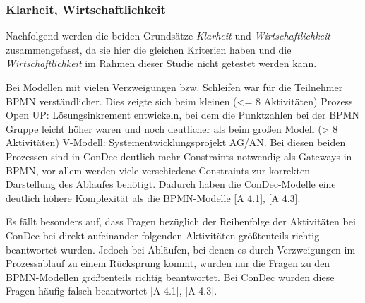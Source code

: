 \subsubsection{Klarheit, Wirtschaftlichkeit}

Nachfolgend werden die beiden Grundsätze \textit{Klarheit} und \textit{Wirtschaftlichkeit} zusammengefasst, da sie hier die gleichen Kriterien haben und die \textit{Wirtschaftlichkeit} im Rahmen dieser Studie nicht getestet werden kann.\newline

Bei Modellen mit vielen Verzweigungen bzw. Schleifen war für die Teilnehmer BPMN verständlicher. Dies zeigte sich beim kleinen (<= 8 Aktivitäten) Prozess \grqq Open UP: Lösungsinkrement entwickeln\grqq, bei dem die Punktzahlen bei der BPMN Gruppe leicht höher waren und noch deutlicher als beim großen Modell (> 8 Aktivitäten) \grqq V-Modell: Systementwicklungsprojekt AG/AN\grqq. Bei diesen beiden Prozessen sind in ConDec deutlich mehr Constraints notwendig als Gateways in BPMN, vor allem werden viele verschiedene Constraints zur korrekten Darstellung des Ablaufes benötigt. Dadurch haben die ConDec-Modelle eine deutlich höhere Komplexität als die BPMN-Modelle [A 4.1], [A 4.3].\newline

Es fällt besonders auf, dass Fragen bezüglich der Reihenfolge der Aktivitäten bei ConDec bei direkt aufeinander folgenden Aktivitäten größtenteils richtig beantwortet wurden. Jedoch bei Abläufen, bei denen es durch Verzweigungen im Prozessablauf zu einem Rücksprung kommt, wurden nur die Fragen zu den BPMN-Modellen größtenteils richtig beantwortet. Bei ConDec wurden diese Fragen häufig falsch beantwortet [A 4.1], [A 4.3].\newline

